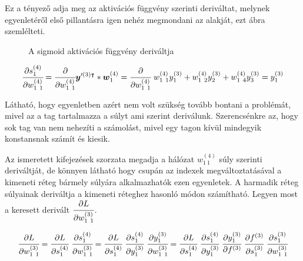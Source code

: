 Ez a tényező adja meg az aktivációs függvény szerinti deriváltat, melynek egyenletéről első pillantásra igen nehéz megmondani az alakját, ezt  ábra szemlélteti.

 \begin{figure}[H]
        \centering
	\caption{A sigmoid aktivációs függvény deriváltja \label{sigderiv}}
\end{figure}

\begin{equation}
    \cfrac{\partial s^{(4)}_{1}}{\partial w^{(4)}_{1~1}} = \cfrac{\partial }{\partial w^{(4)}_{1~1}} \boldsymbol y'^{(3) \intercal}* \boldsymbol w^{(4)}_1= \cfrac{\partial }{\partial w^{(4)}_{1~1}}~ w^{(4)}_{1~1}y^{(3)}_{1} + w^{(4)}_{1~2}y^{(3)}_{2} + w^{(4)}_{1~4}y^{(3)}_{3} = y^{(3)}_{1}
    \label{weightderiv}
\end{equation}

Látható, hogy  egyenletben azért nem volt szükség tovább bontani a problémát, mivel az a tag tartalmazza a súlyt ami szerint deriválunk. Szerencsénkre az, hogy sok tag van nem nehezíti a számolást, mivel egy tagon kívül mindegyik konstansnak számít és kiesik.

Az ismeretett kifejezések szorzata megadja a hálózat  $w^{(4)}_{1~1}$ súly szerinti deriváltját, de könnyen látható hogy csupán az indexek megváltoztatásával a kimeneti réteg bármely súlyára alkalmazhatók ezen egyenletek. A harmadik réteg súlyainak deriváltja a kimeneti réteghez hasonló módon számítható. Legyen most a keresett derivált $\cfrac{\partial L}{\partial w^{(3)}_{1~1}}$.

\begin{equation}
    \cfrac{\partial L}{\partial w^{(3)}_{1~1}} = \cfrac{\partial L}{\partial s^{(4)}_{1}}~\cfrac{\partial s^{(4)}_{1}}{\partial  w^{(3)}_{1~1}} = \cfrac{\partial L}{\partial s^{(4)}_{1}}~\cfrac{\partial s^{(4)}_{1}}{\partial y^{(3)}_1}~\cfrac{\partial y^{(3)}_1}{\partial  w^{(3)}_{1~1}} = 
    \cfrac{\partial L}{\partial s^{(4)}_{1}}~\cfrac{\partial s^{(4)}_{1}}{\partial y^{(3)}_1}~\cfrac{\partial y^{(3)}_1}{\partial f^{(3)}}~\cfrac{\partial f^{(3)}}{\partial s^{(3)}_{1}}~\cfrac{\partial s^{(3)}_{1}}{\partial  w^{(3)}_{1~1}}
    \label{derivthirdlayer}
\end{equation}

